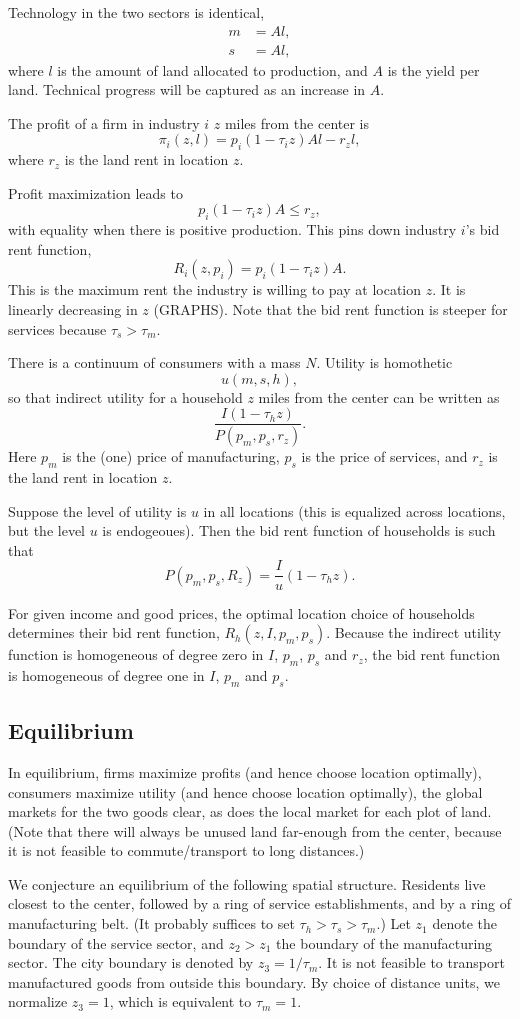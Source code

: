 \documentclass[letter]{amsart}
\theoremstyle{definition}
\theoremstyle{remark}
\numberwithin{equation}{section}
\begin{document}
Technology in the two sectors is identical,
\begin{align*}
m&=Al,\\
s&=Al,
\end{align*}
where $l$ is the amount of land allocated to production, and $A$ is the yield per land. Technical progress will be captured as an increase in $A$.

The profit of a firm in industry $i$ $z$ miles from the center is 
\[
\pi_i(z,l) = p_i(1-\tau_i z)Al - r_zl,
\]
where $r_z$ is the land rent in location $z$. 

Profit maximization leads to
\[
p_i(1-\tau_i z)A \le r_z,
\]
with equality when there is positive production. This pins down industry $i$'s bid rent function,
\[
R_i(z,p_i) = p_i(1-\tau_i z)A.
\]
This is the maximum rent the industry is willing to pay at location $z$. It is linearly decreasing in $z$ (GRAPHS). Note that the bid rent function is steeper for services because $\tau_s>\tau_m$.


There is a continuum of consumers with a mass $N$. Utility is homothetic
\[
u(m,s,h),
\]
so that indirect utility for a household $z$ miles from the center can be written as
\[
\frac{I(1-\tau_hz)}{P(p_m,p_s,r_z)}.
\]
Here $p_m$ is the (one) price of manufacturing, $p_s$ is the price of services, and $r_z$ is the land rent in location $z$.

Suppose the level of utility is $u$ in all locations (this is equalized across locations, but the level $u$ is endogeoues). Then the bid rent function of households is such that
\[
P(p_m,p_s,R_z) = \frac Iu (1-\tau_h z).
\]

For given income and good prices, the optimal location choice of households determines their bid rent function, $R_h(z,I,p_m,p_s)$. Because the indirect utility function is homogeneous of degree zero in $I$, $p_m$, $p_s$ and $r_z$, the bid rent function is homogeneous of degree one in $I$, $p_m$ and $p_s$.
\subsection{Equilibrium}
In equilibrium, firms maximize profits (and hence choose location optimally), consumers maximize utility (and hence choose location optimally), the global markets for the two goods clear, as does the local market for each plot of land. (Note that there will always be unused land far-enough from the center, because it is not feasible to commute/transport to long distances.)

We conjecture an equilibrium of the following spatial structure. Residents live closest to the center, followed by a ring of service establishments, and by a ring of manufacturing belt. (It probably suffices to set $\tau_h>\tau_s>\tau_m$.) Let $z_1$ denote the boundary of the service sector, and $z_2>z_1$ the boundary of the manufacturing sector. The city boundary is denoted by $z_3 = 1/\tau_m$. It is not feasible to transport manufactured goods from outside this boundary. By choice of distance units, we normalize $z_3=1$, which is equivalent to $\tau_m=1$.
\end{document}
